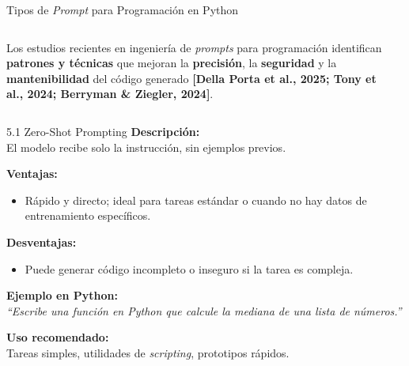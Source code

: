 \documentclass[xcolor=svgnames,t]{beamer}
\newcommand{\tightitem}{\itemsep4pt\parskip0pt\parsep0pt}
\begin{document}
{\begin{frame}{Tipos de \textit{Prompt} para Programación en Python}
\begin{columns}[T,totalwidth=\textwidth]
\medskip
Los estudios recientes en ingeniería de \textit{prompts} para programación identifican \textbf{patrones y técnicas} que mejoran la \textbf{precisión}, la \textbf{seguridad} y la \textbf{mantenibilidad} del código generado \textbf{[Della Porta et al., 2025; Tony et al., 2024; Berryman \& Ziegler, 2024]}.



\begin{center}
\end{center}
\end{columns}

\end{frame}
\begin{frame}{5.1 Zero-Shot Prompting}
\justifying
\textbf{Descripción:}\\
El modelo recibe solo la instrucción, sin ejemplos previos.

\medskip
\textbf{Ventajas:}
\begin{itemize}\tightitem
  \item Rápido y directo; ideal para tareas estándar o cuando no hay datos de entrenamiento específicos.
\end{itemize}

\textbf{Desventajas:}
\begin{itemize}\tightitem
  \item Puede generar código incompleto o inseguro si la tarea es compleja.
\end{itemize}

\textbf{Ejemplo en Python:}\\
\textit{“Escribe una función en Python que calcule la mediana de una lista de números.”}

\medskip
\textbf{Uso recomendado:}\\
Tareas simples, utilidades de \textit{scripting}, prototipos rápidos.
\end{frame}

}
\end{document}
